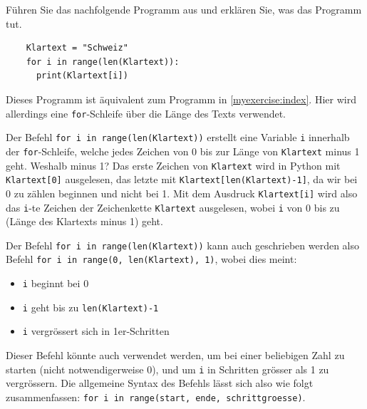 \begin{myexercise}
	Führen Sie das nachfolgende Programm aus und erklären Sie, was das Programm tut.
	\begin{lstlisting}
    Klartext = "Schweiz"
    for i in range(len(Klartext)):
      print(Klartext[i])
  \end{lstlisting}
	\begin{myanswer}
		Dieses Programm ist äquivalent zum Programm in \cref{myexercise:index}.
		Hier wird allerdings eine \lstinline|for|-Schleife über die Länge des Texts verwendet.
	\end{myanswer}
\end{myexercise}

Der Befehl \lstinline|for i in range(len(Klartext))| erstellt eine Variable \lstinline|i| innerhalb der \lstinline|for|-Schleife, welche jedes Zeichen von 0 bis zur Länge von \lstinline|Klartext| minus 1 geht. Weshalb minus 1? Das erste Zeichen von \lstinline|Klartext| wird in Python mit \lstinline|Klartext[0]| ausgelesen, das letzte mit \lstinline|Klartext[len(Klartext)-1]|, da wir bei 0 zu zählen beginnen und nicht bei 1. Mit dem Ausdruck \lstinline|Klartext[i]| wird also das \lstinline|i|-te Zeichen der Zeichenkette \lstinline|Klartext| ausgelesen, wobei \lstinline|i| von 0 bis zu (Länge des Klartexts minus 1) geht.

Der Befehl \lstinline|for i in range(len(Klartext))| kann auch geschrieben werden also Befehl \lstinline|for i in range(0, len(Klartext), 1)|, wobei dies meint:
\begin{itemize}
	\item \lstinline|i| beginnt bei 0
	\item \lstinline|i| geht bis zu \lstinline|len(Klartext)-1|
	\item \lstinline|i| vergrössert sich in 1er-Schritten
\end{itemize}
Dieser Befehl könnte auch verwendet werden, um bei einer beliebigen Zahl zu starten (nicht notwendigerweise 0), und um \lstinline|i| in Schritten grösser als 1 zu vergrössern. Die allgemeine Syntax des Befehls lässt sich also wie folgt zusammenfassen: \lstinline|for i in range(start, ende, schrittgroesse)|.

